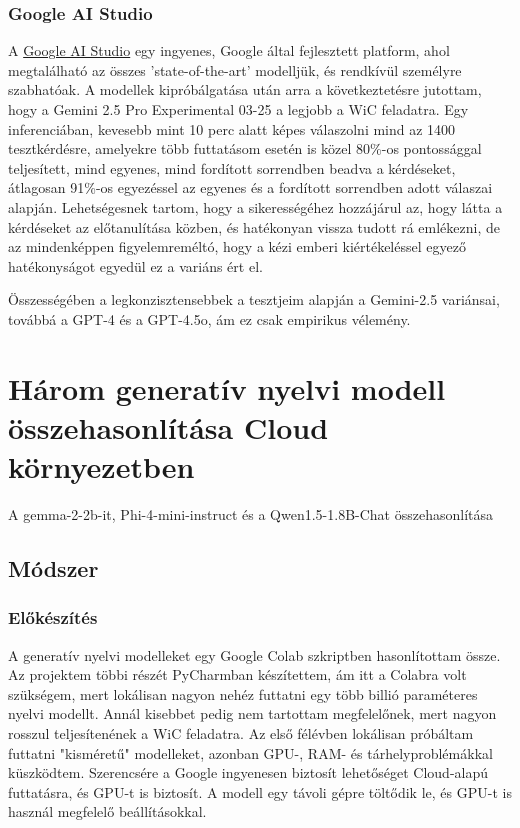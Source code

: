 \documentclass[12pt]{report}
\theoremstyle{definition}
\begin{document}
\subsection{Google AI Studio}
A \href{https://aistudio.google.com/prompts/new_chat}{Google AI Studio} egy ingyenes, Google által fejlesztett platform, ahol megtalálható az összes 'state-of-the-art' modelljük, és rendkívül személyre szabhatóak. A modellek kipróbálgatása után arra a következtetésre jutottam, hogy a Gemini 2.5 Pro Experimental 03-25 a legjobb a WiC feladatra. Egy inferenciában, kevesebb mint 10 perc alatt képes válaszolni mind az 1400 tesztkérdésre, amelyekre több futtatásom esetén is közel 80\%-os pontossággal teljesített, mind egyenes, mind fordított sorrendben beadva a kérdéseket, átlagosan 91\%-os egyezéssel az egyenes és a fordított sorrendben adott válaszai alapján. Lehetségesnek tartom, hogy a sikerességéhez hozzájárul az, hogy látta a kérdéseket az előtanulítása közben, és hatékonyan vissza tudott rá emlékezni, de az mindenképpen figyelemreméltó, hogy a kézi emberi kiértékeléssel egyező hatékonyságot egyedül ez a variáns ért el.

Összességében a legkonzisztensebbek a tesztjeim alapján a Gemini-2.5 variánsai, továbbá a GPT-4 és a GPT-4.5o, ám ez csak empirikus vélemény.


\chapter{Három generatív nyelvi modell összehasonlítása Cloud környezetben}
{
	\centering %
	{\Large A gemma-2-2b-it, Phi-4-mini-instruct és a Qwen1.5-1.8B-Chat összehasonlítása \par} %

	\vspace{1cm} %
}
\section{Módszer}

\subsection{Előkészítés}
A generatív nyelvi modelleket egy Google Colab szkriptben hasonlítottam össze. Az projektem többi részét PyCharmban készítettem, ám itt a Colabra volt szükségem, mert lokálisan nagyon nehéz futtatni egy több billió paraméteres nyelvi modellt. Annál kisebbet pedig nem tartottam megfelelőnek, mert nagyon rosszul teljesítenének a WiC feladatra. Az első félévben lokálisan próbáltam futtatni "kisméretű" modelleket, azonban GPU-, RAM- és tárhelyproblémákkal küszködtem. Szerencsére a Google ingyenesen biztosít lehetőséget Cloud-alapú futtatásra, és GPU-t is biztosít. A modell egy távoli gépre töltődik le, és GPU-t is használ megfelelő beállításokkal.
\end{document}
